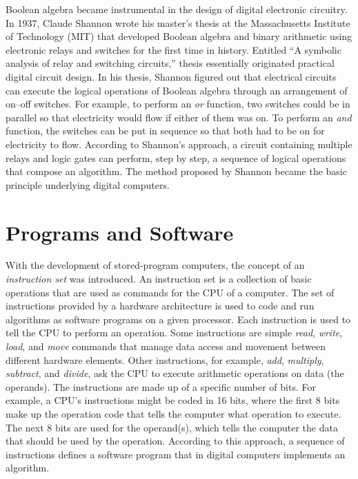 Boolean algebra became instrumental in the design of digital electronic circuitry. In 1937, Claude Shannon wrote his master's thesis at the Massachusetts Institute of Technology (MIT) that developed Boolean algebra and binary arithmetic using electronic relays and switches for the first time in history. Entitled ``A symbolic analysis of relay and switching circuits,'' \citet{chap:02:Shannon:1938} thesis essentially originated practical digital circuit design. In his thesis, Shannon figured out that electrical circuits can execute the logical operations of Boolean algebra through an arrangement of on--off switches. For example, to perform an \textit{or} function, two switches could be in parallel so that electricity would flow if either of them was on. To perform an \textit{and} function, the switches can be put in sequence so that both had to be on for electricity to flow. According to Shannon's approach, a circuit containing multiple relays and logic gates can perform, step by step, a sequence of logical operations that compose an algorithm. The method proposed by Shannon became the basic principle underlying digital computers.

\section{\label{sec:2.4}Programs and Software}

With the development of stored-program computers, the concept of an \textit{instruction set} was introduced. An instruction set is a collection of basic operations that are used as commands for the CPU of a computer. The set of instructions provided by a hardware architecture is used to code and run algorithms as software programs on a given processor. Each instruction is used to tell the CPU to perform an operation. Some instructions are simple \textit{read}, \textit{write}, \textit{load}, and \textit{move} commands that manage data access and movement between different hardware elements. Other instructions, for example, \textit{add}, \textit{multiply}, \textit{subtract}, and \textit{divide}, ask the CPU to execute arithmetic operations on data (the operands). The instructions are made up of a specific number of bits. For example, a CPU's instructions might be coded in 16 bits, where the first 8 bits make up the operation code that tells the computer what operation to execute. The next 8 bits are used for the operand(s), which tells the computer the data that should be used by the operation. According to this approach, a sequence of instructions defines a software program that in digital computers implements an algorithm.

